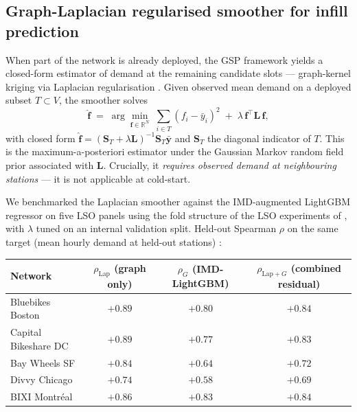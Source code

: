 \subsection{Graph-Laplacian regularised smoother for infill prediction}
\label{sec:gsp-laplacian}

When part of the network is already deployed, the GSP framework
yields a closed-form estimator of demand at the remaining
candidate slots — graph-kernel kriging via Laplacian
regularisation \citep{Belkin2004,Zhu2003}.  Given observed mean
demand on a deployed subset $T \subset V$, the smoother solves
\begin{equation}
    \hat{\mathbf{f}} \;=\; \arg\min_{\mathbf{f} \in \mathbb{R}^N} \;
    \sum_{i \in T} (f_i - \bar{y}_i)^2 \;+\; \lambda \, \mathbf{f}^{\top} \mathbf{L} \, \mathbf{f},
    \label{eq:lap-reg}
\end{equation}
with closed form
$\hat{\mathbf{f}} = (\mathbf{S}_T + \lambda \mathbf{L})^{-1} \mathbf{S}_T \bar{\mathbf{y}}$
and $\mathbf{S}_T$ the diagonal indicator of $T$.  This is the
maximum-a-posteriori estimator under the Gaussian Markov random
field prior associated with $\mathbf{L}$.  Crucially, it
\emph{requires observed demand at neighbouring stations} — it is
not applicable at cold-start.

We benchmarked the Laplacian smoother against the IMD-augmented
LightGBM regressor on five LSO panels using the fold structure
of the LSO experiments of \citet{Fosse2026imd_national}, with $\lambda$ tuned on an internal
validation split.  Held-out Spearman $\rho$ on the same target
(mean hourly demand at held-out stations) :

\begin{center}
\small
\begin{tabular}{@{}lccc@{}}
\toprule
Network & $\rho_{\mathrm{Lap}}$ (graph only) & $\rho_{G}$ (IMD-LightGBM) & $\rho_{\mathrm{Lap}+G}$ (combined residual) \\
\midrule
Bluebikes Boston       & $\mathbf{+0.89}$ & $+0.80$ & $+0.84$ \\
Capital Bikeshare DC    & $\mathbf{+0.89}$ & $+0.77$ & $+0.83$ \\
Bay Wheels SF          & $\mathbf{+0.84}$ & $+0.64$ & $+0.72$ \\
Divvy Chicago          & $\mathbf{+0.74}$ & $+0.58$ & $+0.69$ \\
BIXI Montr\'eal         & $\mathbf{+0.86}$ & $+0.83$ & $+0.84$ \\
\bottomrule
\end{tabular}
\end{center}

